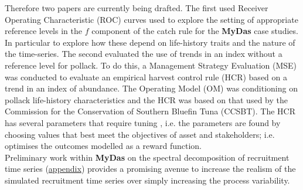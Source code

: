 Therefore two papers are currently being drafted. The first used Receiver Operating Characteristic (ROC) curves used to explore the setting of appropriate reference levels in the $f$ component of the catch rule for the \textbf{MyDas} case studies. In particular to explore how these depend on life-history traits and the nature of the time-series. The second evaluated the use of trends in an index without a reference level for pollack. To do this, a Management Strategy Evaluation (MSE) was conducted to evaluate an empirical harvest control rule (HCR) based on a trend in an index of
abundance. The Operating Model (OM) was conditioning on pollack life-history characteristics and the HCR was based on that used by the Commission for the Conservation of Southern Bluefin Tuna (CCSBT). The HCR has several parameters that require tuning \citep{hillary2015scientific}, i.e. the parameters are found by choosing values that best meet the objectives of asset and stakeholders; i.e. optimises the outcomes modelled as a reward function.\\
Preliminary work within {\bf{MyDas}} on the spectral decomposition of recruitment time series (\hyperref[appendix:spectral]{appendix}) provides a promising avenue to increase the realism of the simulated recruitment time series over simply increasing the process variability. 

